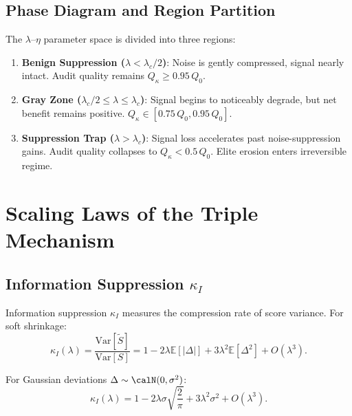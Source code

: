 \documentclass[12pt,a4paper]{article}
\theoremstyle{definition}
\newcommand{\E}{\mathbb{E}}
\newcommand{\Var}{\mathrm{Var}}
\begin{document}
\subsection{Phase Diagram and Region Partition}
\label{sec:phase_diagram}

The $\lambda$--$\eta$ parameter space is divided into three regions:

\begin{enumerate}[label=\textbf{Region \Roman*}, leftmargin=*]
    \item \textbf{Benign Suppression ($\lambda < \lambda_c/2$)}: Noise is gently compressed, signal nearly intact. Audit quality remains $Q_\kappa \geq 0.95\,Q_0$.
    \item \textbf{Gray Zone ($\lambda_c/2 \leq \lambda \leq \lambda_c$)}: Signal begins to noticeably degrade, but net benefit remains positive. $Q_\kappa \in [0.75\,Q_0, 0.95\,Q_0]$.
    \item \textbf{Suppression Trap ($\lambda > \lambda_c$)}: Signal loss accelerates past noise-suppression gains. Audit quality collapses to $Q_\kappa < 0.5\,Q_0$. Elite erosion enters irreversible regime.
\end{enumerate}

\section{Scaling Laws of the Triple Mechanism}
\label{sec:scaling}

\subsection{Information Suppression $\kappa_I$}

Information suppression $\kappa_I$ measures the compression rate of score variance. For soft shrinkage:
\begin{equation}
    \kappa_I(\lambda) = \frac{\Var[\tilde{S}]}{\Var[S]} = 1 - 2\lambda\E[|\Delta|] + 3\lambda^2\E[\Delta^2] + O(\lambda^3).
\end{equation}

For Gaussian deviations $\Delta \sim \calN(0, \sigma^2)$:
\begin{equation}
    \kappa_I(\lambda) = 1 - 2\lambda\sigma\sqrt{\frac{2}{\pi}} + 3\lambda^2\sigma^2 + O(\lambda^3).
\end{equation}
\end{document}
